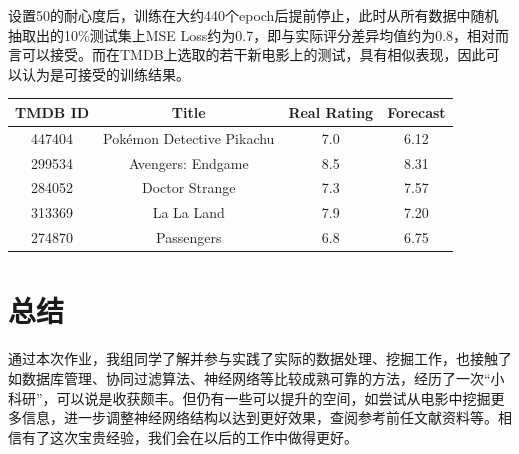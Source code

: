 \documentclass[UTF8]{ctexart}
\begin{document}
\par 设置50的耐心度后，训练在大约440个epoch后提前停止，此时从所有数据中随机抽取出的10\%测试集上MSE Loss约为0.7，即与实际评分差异均值约为0.8，相对而言可以接受。而在TMDB上选取的若干新电影上的测试，具有相似表现，因此可以认为是可接受的训练结果。
\par
\begin{center}
  \begin{tabular}{cccc}
    \hline
    TMDB ID& Title& Real Rating& Forecast\\
    \hline
    447404& Pokémon Detective Pikachu& 7.0& 6.12\\
    299534& Avengers: Endgame& 8.5& 8.31\\
    284052& Doctor Strange& 7.3& 7.57\\
    313369& La La Land& 7.9& 7.20\\
    274870& Passengers& 6.8& 6.75\\
    \hline
  \end{tabular}
\end{center}
\section{总结}
\par 通过本次作业，我组同学了解并参与实践了实际的数据处理、挖掘工作，也接触了如数据库管理、协同过滤算法、神经网络等比较成熟可靠的方法，经历了一次“小科研”，可以说是收获颇丰。但仍有一些可以提升的空间，如尝试从电影中挖掘更多信息，进一步调整神经网络结构以达到更好效果，查阅参考前任文献资料等。相信有了这次宝贵经验，我们会在以后的工作中做得更好。
\end{document}
